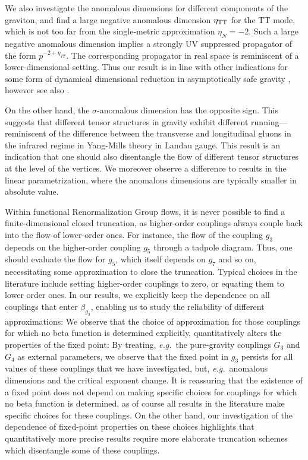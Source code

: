 \documentclass[11pt]{book}
\newcommand\eg{\textit{e.g.}\ }
\numberwithin{equation}{chapter}
\begin{document}
We also investigate the anomalous dimensions for different components of the graviton,
and find a large negative anomalous dimension $\eta_{\rm TT}$ for the TT mode,
which is not too far from the single-metric approximation $\eta_N=-2$.
Such a large negative anomalous dimension implies a strongly UV suppressed propagator of the form
$p^{-2+\eta_{TT}}$. The corresponding propagator in real space is reminiscent of a lower-dimensional setting.
Thus our result is in line with other indications for some form of dynamical dimensional reduction
in asymptotically safe gravity
\cite{Lauscher:2001ya, Lauscher:2005qz, Reuter:2011ah, Rechenberger:2012pm, Calcagni:2013vsa},
however see also \cite{DOdorico:2015jtl}.

On the other hand, the  $\sigma$-anomalous dimension has the opposite sign.
This suggests that different tensor structures in gravity exhibit different running---reminiscent
of the difference between the transverse and longitudinal gluons in the infrared regime
in Yang-Mills theory in Landau gauge.
This result is an indication that one should also disentangle the flow of different tensor structures
at the level of the vertices.
We moreover observe a difference to results in the linear parametrization,
where the anomalous dimensions are typically smaller in  absolute value.

Within functional Renormalization Group flows, it is never possible to find a finite-dimensional
closed truncation, as higher-order couplings always couple back into the flow of lower-order ones.
For instance, the flow of the coupling $g_3$ depends on the higher-order coupling $g_5$ through
a tadpole diagram. Thus, one should evaluate the flow for $g_5$,
which itself depends on $g_7$ and so on, necessitating some approximation to close the truncation.
Typical choices in the literature include setting higher-order couplings to zero,
or equating them to lower order ones. In our results,
we explicitly keep the dependence on all couplings that enter $\beta_{g_3}$,
enabling us to study the reliability of different approximations:
We observe that the choice of approximation for those couplings for which no beta function is
determined explicitly, quantitatively alters the properties of the fixed point: By treating,
\eg the pure-gravity couplings $G_3$ and $G_4$ as external parameters, we observe that the
fixed point in $g_3$ persists for all values of these couplings that we have investigated,
but, \eg anomalous dimensions and the critical exponent change.
It is reassuring that the existence of a fixed point does not  depend on making specific choices
for couplings for which no beta function is determined, as of course all results in the literature
make specific choices for these couplings. On the other hand,
our investigation of the dependence of fixed-point properties on these choices highlights that quantitatively
more precise results require
 more elaborate truncation schemes which disentangle some of these couplings.
\end{document}
